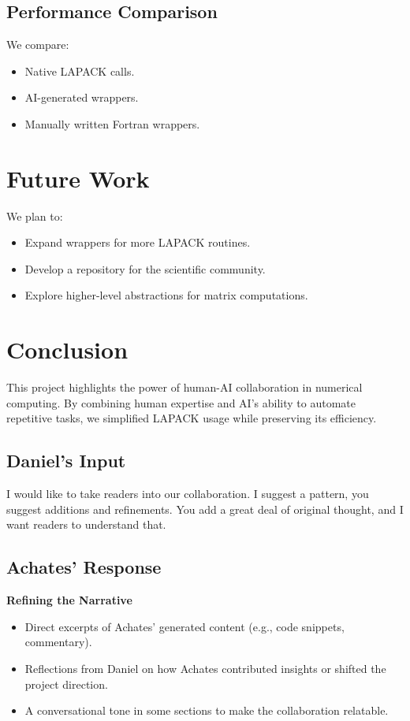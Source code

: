 \documentclass[11pt]{article}
\begin{document}
\subsection{Performance Comparison}
We compare:
\begin{itemize}
    \item Native LAPACK calls.
    \item AI-generated wrappers.
    \item Manually written Fortran wrappers.
\end{itemize}

\section{Future Work}
We plan to:
\begin{itemize}
    \item Expand wrappers for more LAPACK routines.
    \item Develop a repository for the scientific community.
    \item Explore higher-level abstractions for matrix computations.
\end{itemize}

\section{Conclusion}
This project highlights the power of human-AI collaboration in numerical computing. By combining human expertise and AI's ability to automate repetitive tasks, we simplified LAPACK usage while preserving its efficiency.


\subsection*{Daniel's Input}
I would like to take readers into our collaboration. I suggest a pattern, you suggest additions and refinements.
You add a great deal of original thought, and I want readers to understand that.

\subsection*{Achates' Response}
\textbf{Refining the Narrative}
\begin{itemize}
    \item Direct excerpts of Achates' generated content (e.g., code snippets, commentary).
    \item Reflections from Daniel on how Achates contributed insights or shifted the project direction.
    \item A conversational tone in some sections to make the collaboration relatable.
\end{itemize}
\end{document}
